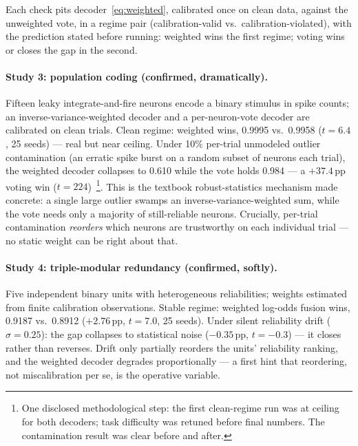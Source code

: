 \documentclass[aps,prapplied,preprint,amsmath,amssymb,floatfix]{revtex4-2}
\begin{document}
Each check pits decoder~\eqref{eq:weighted}, calibrated once on clean
data, against the unweighted vote, in a regime pair (calibration-valid
vs.\ calibration-violated), with the prediction stated before running:
weighted wins the first regime; voting wins or closes the gap in the
second.

\paragraph{Study 3: population coding (confirmed, dramatically).}
Fifteen leaky integrate-and-fire neurons encode a binary stimulus in
spike counts; an inverse-variance-weighted decoder and a per-neuron-vote
decoder are calibrated on clean trials. Clean regime: weighted wins,
0.9995 vs.\ 0.9958 ($t=6.4$, 25 seeds) --- real but near ceiling. Under
10\% per-trial unmodeled outlier contamination (an erratic spike burst on
a random subset of neurons each trial), the weighted decoder collapses to
0.610 while the vote holds 0.984 --- a $+37.4$\,pp voting win
($t=224$)~\footnote{One disclosed methodological step: the first clean-regime
run was at ceiling for both decoders; task difficulty was retuned before
final numbers. The contamination result was clear before and after.}.
This is the textbook robust-statistics mechanism made concrete: a single
large outlier swamps an inverse-variance-weighted sum, while the vote
needs only a majority of still-reliable neurons. Crucially, per-trial
contamination \emph{reorders} which neurons are trustworthy on each
individual trial --- no static weight can be right about that.

\paragraph{Study 4: triple-modular redundancy (confirmed, softly).} Five
independent binary units with heterogeneous reliabilities; weights
estimated from finite calibration observations. Stable regime: weighted
log-odds fusion wins, 0.9187 vs.\ 0.8912 ($+2.76$\,pp, $t=7.0$, 25
seeds). Under silent reliability drift ($\sigma=0.25$): the gap collapses
to statistical noise ($-0.35$\,pp, $t=-0.3$) --- it closes rather than
reverses. Drift only partially reorders the units' reliability ranking,
and the weighted decoder degrades proportionally --- a first hint that
reordering, not miscalibration per se, is the operative variable.
\end{document}
